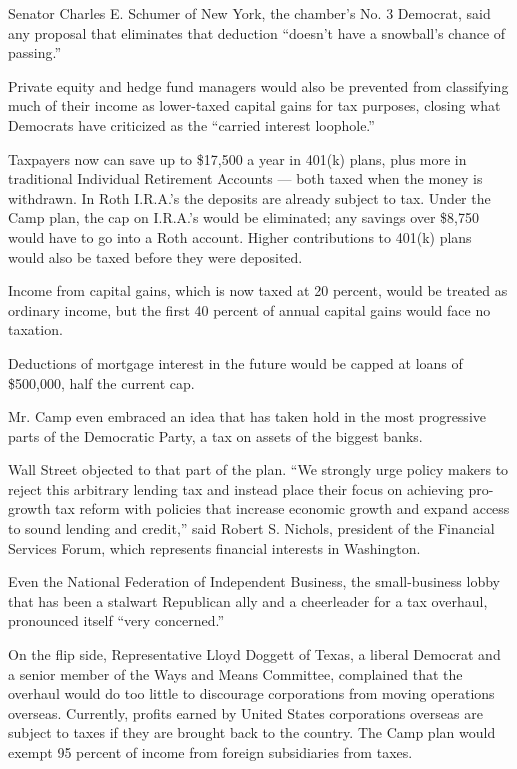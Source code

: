 Senator Charles E. Schumer of New York, the chamber's No. 3 Democrat,
said any proposal that eliminates that deduction ``doesn't have a
snowball's chance of passing.''

Private equity and hedge fund managers would also be prevented from
classifying much of their income as lower-taxed capital gains for tax
purposes, closing what Democrats have criticized as the ``carried
interest loophole.''

Taxpayers now can save up to \$17,500 a year in 401(k) plans, plus more
in traditional Individual Retirement Accounts --- both taxed when the
money is withdrawn. In Roth I.R.A.'s the deposits are already subject to
tax. Under the Camp plan, the cap on I.R.A.'s would be eliminated; any
savings over \$8,750 would have to go into a Roth account. Higher
contributions to 401(k) plans would also be taxed before they were
deposited.

Income from capital gains, which is now taxed at 20 percent, would be
treated as ordinary income, but the first 40 percent of annual capital
gains would face no taxation.

Deductions of mortgage interest in the future would be capped at loans
of \$500,000, half the current cap.

Mr. Camp even embraced an idea that has taken hold in the most
progressive parts of the Democratic Party, a tax on assets of the
biggest banks.

Wall Street objected to that part of the plan. ``We strongly urge policy
makers to reject this arbitrary lending tax and instead place their
focus on achieving pro-growth tax reform with policies that increase
economic growth and expand access to sound lending and credit,'' said
Robert S. Nichols, president of the Financial Services Forum, which
represents financial interests in Washington.

Even the National Federation of Independent Business, the small-business
lobby that has been a stalwart Republican ally and a cheerleader for a
tax overhaul, pronounced itself ``very concerned.''

On the flip side, Representative Lloyd Doggett of Texas, a liberal
Democrat and a senior member of the Ways and Means Committee, complained
that the overhaul would do too little to discourage corporations from
moving operations overseas. Currently, profits earned by United States
corporations overseas are subject to taxes if they are brought back to
the country. The Camp plan would exempt 95 percent of income from
foreign subsidiaries from taxes.

